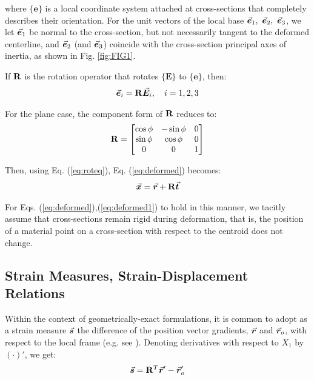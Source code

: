 \noindent where $\{\mathbf{e}\}$ is a local coordinate system attached at
cross-sections that completely describes their orientation. For the unit vectors
of the local base $\vec{\bm{e}}_1,\ \vec{\bm{e}}_2,\ \vec{\bm{e}}_3$, we let $\vec{\bm{e}}_1$ be
normal to the cross-section, but not necessarily tangent to the deformed
centerline, and $\vec{\bm{e}}_2$ (and $\vec{\bm{e}}_3$) coincide with the cross-section
principal axes of inertia, as shown in Fig. \ref{fig:FIG1}.

If $\mathbf{R}$ is the rotation operator that rotates $\{\mathbf{E}\}$ to
$\{\mathbf{e}\}$, then:
\begin{gather}
	\vec{\bm{e}}_i = \mathbf{R}\vec{\bm{E}}_i ,\quad i=1,2,3
	\label{eq:roteq}
\end{gather}

\noindent For the plane case, the component form of $\mathbf{R}$ reduces to:
\begin{gather}
	\mathbf{R} = \begin{bmatrix}
		\cos\phi &-\sin\phi & 0\\
		\sin\phi &\cos\phi & 0\\
		0 & 0 & 1
	\end{bmatrix}
\end{gather}

\noindent Then, using Eq. (\ref{eq:roteq}), Eq. (\ref{eq:deformed}) becomes:
\begin{gather}
	\vec{\bm{x}} = \vec{\bm{r}} + \mathbf{R}\vec{\bm{t}}
	\label{eq:deformed1}
\end{gather}

\noindent For Eqs. (\ref{eq:deformed}),(\ref{eq:deformed1}) to hold in this
manner, we tacitly assume that cross-sections remain rigid during
deformation, that is, the position of a material point on a cross-section
with respect to the centroid does not change.


\subsection{Strain Measures, Strain-Displacement
Relations}\label{subsection:CH2-S2SS2}
Within the context of geometrically-exact formulations, it is common to adopt as
a strain measure $\vec{\bm{s}}$ the difference of the position vector gradients,
$\vec{\bm{r}}$ and $\vec{\bm{r}}_o$, with respect to the local frame (e.g. see
\cite{Simo1,Cardona,Hodges}). Denoting derivatives with respect to $X_1$
by $(\cdot)'$, we get:			%
\begin{gather}
	\vec{\bm{s}} = \mathbf{R}^T\vec{\bm{r}}'- \vec{\bm{r}}'_o
	\label{eq:strm}
\end{gather}

